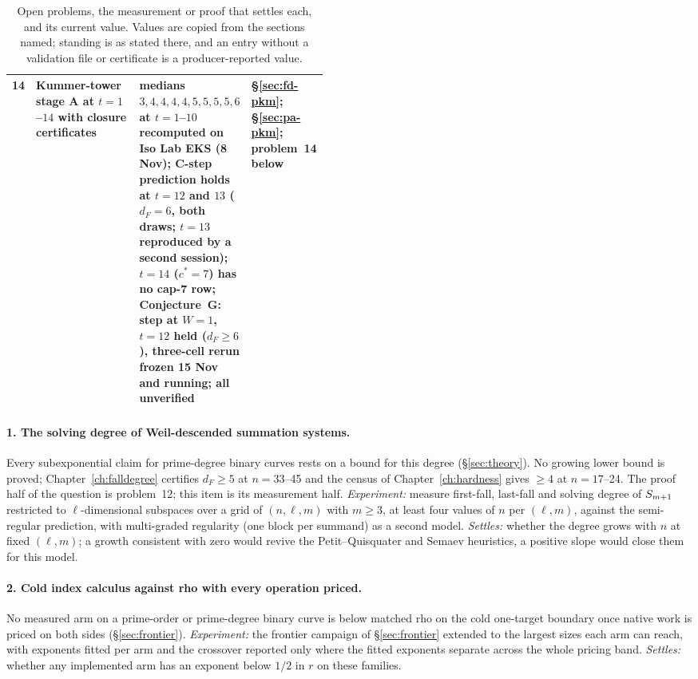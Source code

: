 \begin{table}[tbp]
\begin{tabularx}{\linewidth}{@{}r>{\raggedright}X>{\raggedright}p{0.33\linewidth}>{\raggedright\arraybackslash}p{0.13\linewidth}@{}}
14 & Kummer-tower stage A at $t=1$--$14$ with closure certificates & medians $3,4,4,4,4,5,5,5,5,6$ at $t=1$--$10$ recomputed on Iso Lab EKS (8 Nov); C-step prediction holds at $t=12$ and $13$ ($d_F=6$, both draws; $t=13$ reproduced by a second session); $t=14$ ($c^*=7$) has no cap-7 row; Conjecture~G: step at $W=1$, $t=12$ held ($d_F\ge6$), three-cell rerun frozen 15 Nov and running; all unverified & \S\ref{sec:fd-pkm}; \S\ref{sec:pa-pkm}; problem~14 below \\
\bottomrule
\end{tabularx}
\caption[]{Open problems, the measurement or proof that settles each, and
its current value. Values are copied from the sections named; standing is
as stated there, and an entry without a validation file or certificate is
a producer-reported value.}
\label{tab:fm-open}
\end{table}

\paragraph{1. The solving degree of Weil-descended summation systems.}
Every subexponential claim for prime-degree binary curves rests on a bound
for this degree (\S\ref{sec:theory}). No growing lower bound is proved;
Chapter~\ref{ch:falldegree} certifies $d_F\ge5$ at $n=33$--45 and the
census of Chapter~\ref{ch:hardness} gives $\ge4$ at $n=17$--24. The proof
half of the question is problem~12; this item is its measurement half.
\emph{Experiment:} measure first-fall, last-fall
and solving degree of $S_{m+1}$ restricted to $\ell$-dimensional
subspaces over a grid of $(n,\ell,m)$ with $m\ge3$, at least four values
of $n$ per $(\ell,m)$, against the semi-regular prediction, with
multi-graded regularity (one block per summand) as a second model.
\emph{Settles:} whether the degree grows with $n$ at fixed $(\ell,m)$; a
growth consistent with zero would revive the Petit--Quisquater and Semaev
heuristics, a positive slope would close them for this model.

\paragraph{2. Cold index calculus against rho with every operation
priced.} No measured arm on a prime-order or prime-degree binary curve
is below matched rho on the cold one-target boundary once native work is
priced on both sides (\S\ref{sec:frontier}).
\emph{Experiment:} the frontier campaign of \S\ref{sec:frontier} extended
to the largest sizes each arm can reach, with exponents fitted per arm and
the crossover reported only where the fitted exponents separate across the
whole pricing band. \emph{Settles:} whether any implemented arm has an
exponent below $1/2$ in $r$ on these families.

